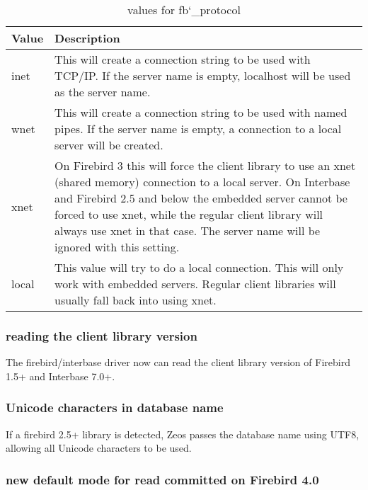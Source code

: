 \documentclass[a4paper,12pt,oneside]{book}
\begin{document}
\begin{table}
    \begin{tabular}{ p{1cm} p{13cm} }
    Value & Description \\ \hline
    inet & This will create a connection string to be used with TCP/IP. If the server name is empty, localhost will be used as the server name. \\ %
    wnet & This will create a connection string to be used with named pipes. If the server name is empty, a connection to a local server will be created. \\ %
    xnet & On Firebird 3 this will force the client library to use an xnet (shared memory) connection to a local server. On Interbase and Firebird 2.5 and below the embedded server cannot be forced to use xnet, while the regular client library will always use xnet in that case. The server name will be ignored with this setting. \\
    local & This value will try to do a local connection. This will only work with embedded servers. Regular client libraries will usually fall back into using xnet. \\
		\end{tabular}
    \caption{values for fb\char`_protocol}
    \label{tbl:Rev6_ValuesFbprotocol}
\end{table}

\subsubsection{reading the client library version}
\label{sec:Rev6_FirebirdInterbase_Changes_ReadingLibraryVersion}

The firebird/interbase driver now can read the client library version of Firebird 1.5+ and Interbase 7.0+.

\subsubsection{Unicode characters in database name}
\label{sec:Rev6_FirebirdInterbase_Changes_UnicodeDatabaseName}

If a firebird 2.5+ library is detected, Zeos passes the database name using UTF8, allowing all Unicode characters to be used.

\subsubsection{new default mode for read committed on Firebird 4.0}
\label{sec:Rev6_FirebirdInterbase_Changes_FB4ReadCommitted}
\end{document}
